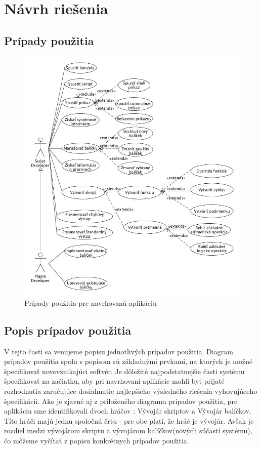 \section{Návrh riešenia}
\subsection{Prípady použitia}
\begin{figure}[!htbp]
	\centering
	\includegraphics[width=\linewidth]{img/usecase.jpg}
	\caption{Prípady použitia pre navrhovanú aplikáciu}
	\label{fig:test}
\end{figure}
\newpage
\subsection{Popis prípadov použitia}
\indent V tejto časti sa venujeme popisu jednotlivých prípadov použitia. Diagram prípadov použitia spolu s popisom sú základnými prvkami, na ktorých je možné špecifikovať novovznikajúci softvér. Je dôležité najpodstatnejšie časti systému špecifikovať na začiatku, aby pri navrhovaní aplikácie mohli byť prijaté rozhodnutia zaručujúce dosiahnutie najlepšieho výsledného riešenia vyhovujúceho špecifikácii. Ako je zjavné aj z priloženého diagramu prípadov použitia, pre aplikáciu sme identifikovali dvoch hráčov : Vývojár skriptov a Vývojár balíčkov. Títo hráči majú jednu spoločnú črtu - pre obe platí, že hráč je vývojár. Avšak je rozdiel medzi vývojárom skriptu a vývojárom balíčkov(nových súčastí systému), čo môžeme vyčítať z popisu konkrétnych prípadov použitia.
